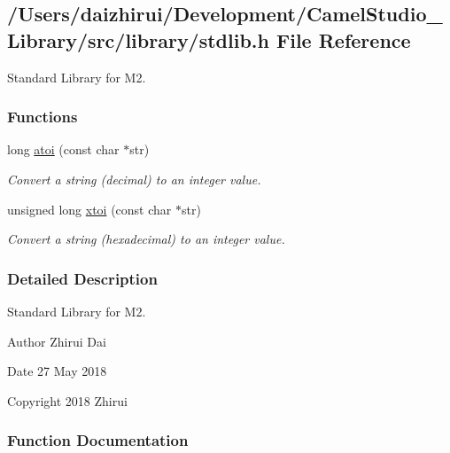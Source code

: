 \hypertarget{a00062}{}\subsection{/\+Users/daizhirui/\+Development/\+Camel\+Studio\+\_\+\+Library/src/library/stdlib.h File Reference}
\label{a00062}


Standard Library for M2.  


\subsubsection*{Functions}
\begin{DoxyCompactItemize}
\item 
long \mbox{\hyperlink{a00062_a36f90d5de53f568b0fc5266ce013b9c5}{atoi}} (const char $\ast$str)
\begin{DoxyCompactList}\small\item\em Convert a string (decimal) to an integer value. \end{DoxyCompactList}\item 
unsigned long \mbox{\hyperlink{a00062_a9d6165da864d16ad50c13690c1e7d7ea}{xtoi}} (const char $\ast$str)
\begin{DoxyCompactList}\small\item\em Convert a string (hexadecimal) to an integer value. \end{DoxyCompactList}\end{DoxyCompactItemize}


\subsubsection{Detailed Description}
Standard Library for M2. 

\begin{DoxyAuthor}{Author}
Zhirui Dai 
\end{DoxyAuthor}
\begin{DoxyDate}{Date}
27 May 2018 
\end{DoxyDate}
\begin{DoxyCopyright}{Copyright}
2018 Zhirui 
\end{DoxyCopyright}


\subsubsection{Function Documentation}
\mbox{\label{a00062_a36f90d5de53f568b0fc5266ce013b9c5}} 
